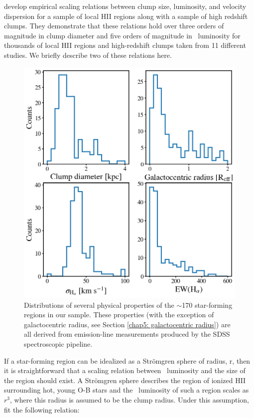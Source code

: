\cite{Wisnioski2012} develop empirical scaling relations between clump size, luminosity, and velocity dispersion for a sample of local HII regions along with a sample of high redshift clumps. They demonstrate that these relations hold over three orders of magnitude in clump diameter and five orders of magnitude in \ha~luminosity for thousands of local HII regions and high-redshift clumps taken from 11 different studies. We briefly describe two of these relations here. 


\begin{figure}
\centering
\includegraphics[width=5in]{Figures/clump_4properties.png}
\caption[Histogram distributions of several physical properties for $\sim$170 ``clumps.'']{Distributions of several physical properties of the $\sim$170 star-forming regions in our sample. These properties (with the exception of galactocentric radius, see Section \ref{chap5: galactocentric radius}) are all derived from emission-line measurements produced by the SDSS spectroscopic pipeline. }
\label{fig: clump histograms}
\end{figure}

If a star-forming region can be idealized as a Str{\"o}mgren sphere of radius, r, then it is straightforward that a scaling relation between \ha~luminosity and the size of the region should exist. A Str{\"o}mgren sphere describes the region of ionized HII surrounding hot, young O-B stars and the \ha~luminosity of such a region scales as $r^3$, where this radius is assumed to be the clump radius. Under this assumption, \citep{Wisnioski2012} fit the following relation:

